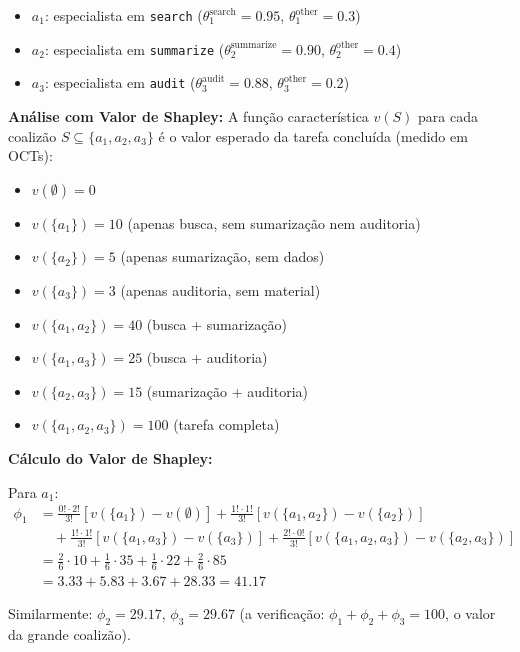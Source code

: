 \begin{itemize}
    \item $a_1$: especialista em \texttt{search} ($\theta_1^{\text{search}} = 0.95$, $\theta_1^{\text{other}} = 0.3$)
    \item $a_2$: especialista em \texttt{summarize} ($\theta_2^{\text{summarize}} = 0.90$, $\theta_2^{\text{other}} = 0.4$)
    \item $a_3$: especialista em \texttt{audit} ($\theta_3^{\text{audit}} = 0.88$, $\theta_3^{\text{other}} = 0.2$)
\end{itemize}

\textbf{Análise com Valor de Shapley:} A função característica $v(S)$ para cada coalizão $S \subseteq \{a_1, a_2, a_3\}$ é o valor esperado da tarefa concluída (medido em OCTs):

\begin{itemize}
    \item $v(\emptyset) = 0$
    \item $v(\{a_1\}) = 10$ (apenas busca, sem sumarização nem auditoria)
    \item $v(\{a_2\}) = 5$ (apenas sumarização, sem dados)
    \item $v(\{a_3\}) = 3$ (apenas auditoria, sem material)
    \item $v(\{a_1, a_2\}) = 40$ (busca + sumarização)
    \item $v(\{a_1, a_3\}) = 25$ (busca + auditoria)
    \item $v(\{a_2, a_3\}) = 15$ (sumarização + auditoria)
    \item $v(\{a_1, a_2, a_3\}) = 100$ (tarefa completa)
\end{itemize}

\textbf{Cálculo do Valor de Shapley:}

Para $a_1$:
\begin{align}
\phi_1 &= \frac{0! \cdot 2!}{3!}[v(\{a_1\}) - v(\emptyset)] 
+ \frac{1! \cdot 1!}{3!}[v(\{a_1,a_2\}) - v(\{a_2\})] \\
&\quad + \frac{1! \cdot 1!}{3!}[v(\{a_1,a_3\}) - v(\{a_3\})] 
+ \frac{2! \cdot 0!}{3!}[v(\{a_1,a_2,a_3\}) - v(\{a_2,a_3\})] \\
&= \frac{2}{6} \cdot 10 + \frac{1}{6} \cdot 35 + \frac{1}{6} \cdot 22 + \frac{2}{6} \cdot 85 \\
&= 3.33 + 5.83 + 3.67 + 28.33 = 41.17
\end{align}

Similarmente: $\phi_2 = 29.17$, $\phi_3 = 29.67$ (a verificação: $\phi_1 + \phi_2 + \phi_3 = 100$, o valor da grande coalizão).

